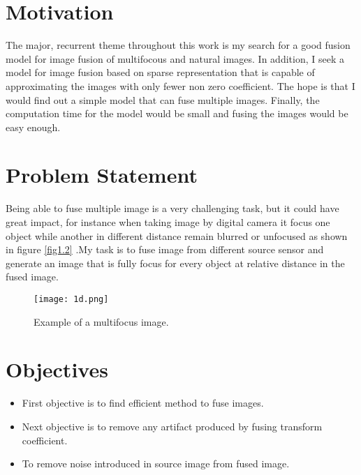 \section{Motivation}
The major, recurrent theme throughout this work is my search for a good fusion model for image fusion of multifocous and natural
images. In addition, I seek a model for image fusion based on sparse representation that is capable of approximating the images with only fewer non zero coefficient. The hope is that I would find out a simple model that can fuse multiple images. Finally, the computation  time for the model would be small and fusing the images would be easy enough.

\section{Problem Statement}\label{sec:ProbStatement}
Being able to fuse multiple image is a very challenging task, but it could have great impact, for instance when taking image by digital camera it focus one object while another in different distance remain blurred or unfocused as shown in figure \ref{fig1.2} .My task is to fuse image from different source sensor and generate an image that is fully focus for every object at relative distance in the fused image.

\begin{figure}[h]
  \centering
  \texttt{[image: 1d.png]}
  \label{fig2}
  \caption{Example of a multifocus image.}
\end{figure}


\section{Objectives}

\begin{itemize}
  \item First objective is to find efficient method to fuse images.
  \item Next objective is to remove any artifact produced by fusing transform coefficient. 
  \item To remove noise introduced in source image from fused image.
\end{itemize}



